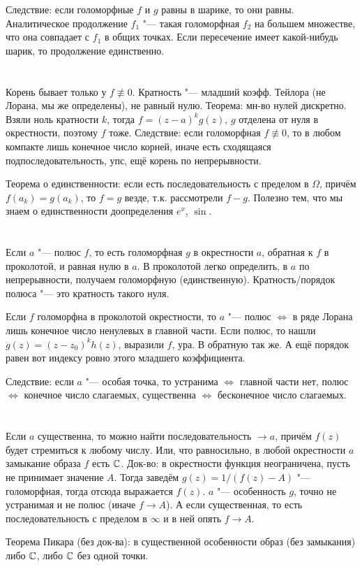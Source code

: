 	Следствие: если голоморфные $f$ и $g$ равны в шарике, то они равны.
	Аналитическое продолжение $f_1$ "--- такая голоморфная $f_2$ на большем множестве,
	что она совпадает с $f_1$ в общих точках.
	Если пересечение имеет какой-нибудь шарик, то продолжение единственно.

\section{} %
	Корень бывает только у $f \nequiv 0$.
	Кратность "--- младший коэфф. Тейлора (не Лорана, мы же определены), не равный нулю.
	Теорема: мн-во нулей дискретно.
	Взяли ноль кратности $k$, тогда $f=(z-a)^kg(z)$, $g$ отделена от нуля в окрестности, поэтому $f$ тоже.
	Следствие: если голоморфная $f \nequiv 0$, то в любом компакте лишь конечное число корней, иначе есть сходящаяся
	подпоследовательность, упс, ещё корень по непрерывности.

	Теорема о единственности: если есть последовательность с пределом в $\Omega$, причём $f(a_k)=g(a_k)$, то $f=g$ везде,
	т.к. рассмотрели $f-g$.
	Полезно тем, что мы знаем о единственности доопределения $e^x$, $\sin$.

\section{} %
	Если $a$ "--- полюс $f$, то есть голоморфная $g$ в окрестности $a$, обратная к $f$ в проколотой, и равная нулю в $a$.
	В проколотой легко определить, в $a$ по непрерывности, получаем голоморфную (единственную).
	Кратность/порядок полюса "--- это кратность такого нуля.

	Если $f$ голоморфна в проколотой окрестности, то $a$ "--- полюс $\iff$ в ряде Лорана лишь конечное число ненулевых в главной части.
	Если полюс, то нашли $g(z)=(z-z_0)^kh(z)$, выразили $f$, ура.
	В обратную так же.
	А ещё порядок равен вот индексу ровно этого младшего коэффициента.

	Следствие: если $a$ "--- особая точка, то устранима $\iff$ главной части нет,
	полюс $\iff$ конечное число слагаемых, существенна $\iff$ бесконечное число слагаемых.

\section{} %
	Если $a$ существенна, то можно найти последовательность $\to a$, причём $f(z)$ будет стремиться к любому числу.
	Или, что равносильно, в любой окрестности $a$ замыкание образа $f$ есть $\mathbb{C}$.
	Док-во: в окрестности функция неограничена, пусть не принимает значение $A$.
	Тогда заведём $g(z)=1/(f(z)-A)$ "--- голоморфная, тогда отсюда выражается $f(z)$.
	$a$ "--- особенность $g$, точно не устранимая и не полюс (иначе $f \to A$).
	А если существенная, то есть последовательность с пределом в $\infty$ и в ней опять $f \to A$.

	Теорема Пикара (без док-ва): в существенной особенности образ (без замыкания) либо $\mathbb{C}$, либо $\mathbb{C}$ без одной точки.
